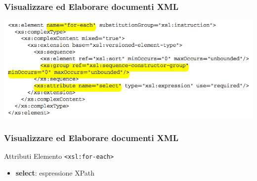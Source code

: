 \begin{frame}
    \frametitle{Visualizzare ed Elaborare documenti XML}
    \addtocounter{nframe}{1}
    
    \begin{center}
        \includegraphics[width=.9\textwidth]{imgs/Schema-for-each.png}
    \end{center}

\end{frame}

\begin{frame}
    \frametitle{Visualizzare ed Elaborare documenti XML}
    \addtocounter{nframe}{1}
    

     \begin{block}{Attributi Elemento \texttt{<xsl:for-each>}}
         \begin{itemize}
             \item \textbf{select}: espressione XPath
        \end{itemize}
     \end{block}
    
\end{frame}

